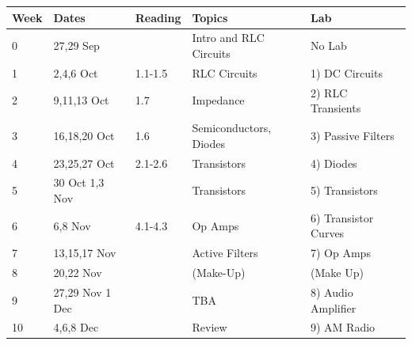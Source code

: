 \documentclass[12pt]{article}
\begin{document}
\begin{table}[h!]
\normalsize %
\begin{tabular}{ lllll }
\hline
\textbf{Week} & \textbf{Dates} & \textbf{Reading} & \textbf{Topics} & \textbf{Lab} \\
\hline
0 & 27,29 Sep & & Intro and RLC Circuits & No Lab \\
\hline
1 & 2,4,6 Oct &  1.1-1.5 & RLC Circuits & 1) DC Circuits \\
\hline
2 & 9,11,13 Oct & 1.7 & Impedance & 2) RLC Transients  \\
\hline
3 & 16,18,20 Oct &  1.6 & Semiconductors, Diodes  & 3) Passive Filters \\
\hline
4 & 23,25,27 Oct & 2.1-2.6 & Transistors & 4) Diodes \\
\hline
5 & 30 Oct 1,3 Nov & & Transistors & 5) Transistors \\
\hline
6 & 6,8 Nov & 4.1-4.3 & Op Amps & 6) Transistor Curves \\
\hline
7 & 13,15,17 Nov & &  Active Filters & 7) Op Amps \\
\hline
8 & 20,22 Nov & & (Make-Up) & (Make Up) \\
\hline
9 & 27,29 Nov 1 Dec & & TBA& 8) Audio Amplifier \\
\hline
10 &  4,6,8 Dec & &  Review & 9) AM Radio \\
\hline
\end{tabular} 
\end{table}
\end{document}
